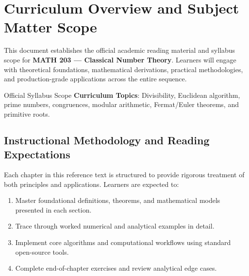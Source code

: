 \section{Curriculum Overview and Subject Matter Scope}

This document establishes the official academic reading material and syllabus scope for \textbf{MATH 203 --- Classical Number Theory}. Learners will engage with theoretical foundations, mathematical derivations, practical methodologies, and production-grade applications across the entire sequence.

\begin{InsightBox}{Official Syllabus Scope}
  \textbf{Curriculum Topics}: Divisibility, Euclidean algorithm, prime numbers, congruences, modular arithmetic, Fermat/Euler theorems, and primitive roots.
\end{InsightBox}

\subsection{Instructional Methodology and Reading Expectations}

Each chapter in this reference text is structured to provide rigorous treatment of both principles and applications. Learners are expected to:
\begin{enumerate}
  \item Master foundational definitions, theorems, and mathematical models presented in each section.
  \item Trace through worked numerical and analytical examples in detail.
  \item Implement core algorithms and computational workflows using standard open-source tools.
  \item Complete end-of-chapter exercises and review analytical edge cases.
\end{enumerate}

